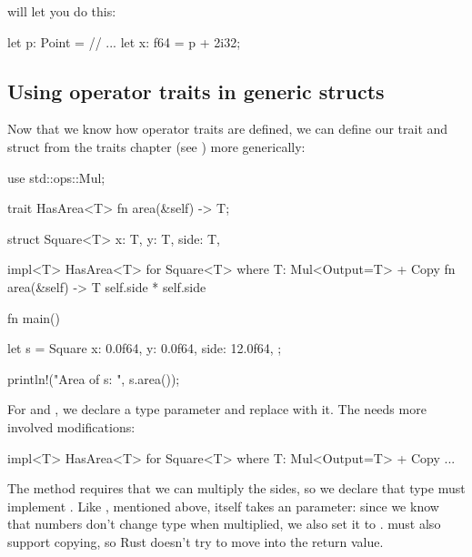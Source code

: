 will let you do this:

\begin{rustc}
let p: Point = // ...
let x: f64 = p + 2i32;
\end{rustc}

\subsection*{Using operator traits in generic structs}

Now that we know how operator traits are defined, we can define our  trait and  struct from the 
traits chapter (see ) more generically:

\begin{rustc}
use std::ops::Mul;

trait HasArea<T> {
    fn area(&self) -> T;
}

struct Square<T> {
    x: T,
    y: T,
    side: T,
}

impl<T> HasArea<T> for Square<T>
        where T: Mul<Output=T> + Copy {
    fn area(&self) -> T {
        self.side * self.side
    }
}

fn main() {
    let s = Square {
        x: 0.0f64,
        y: 0.0f64,
        side: 12.0f64,
    };

    println!("Area of s: {}", s.area());
}
\end{rustc}

For  and , we declare a type parameter  and replace  with it. The  needs more 
involved modifications:

\begin{rustc}
impl<T> HasArea<T> for Square<T>
        where T: Mul<Output=T> + Copy { ... }
\end{rustc}

The  method requires that we can multiply the sides, so we declare that type  must implement . 
Like , mentioned above,  itself takes an  parameter: since we know that numbers don't change type when 
multiplied, we also set it to .  must also support copying, so Rust doesn't try to move  into the return value.
